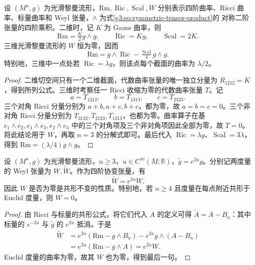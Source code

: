 \begin{proposition}\label{g3:prop:low-dimensional-curvature}
	设 \((M^n,g)\) 为光滑黎曼流形，\(\mathrm{Rm},\operatorname{Ric},\operatorname{Scal},W\) 分别表示四阶曲率、Ricci 曲率、标量曲率和 Weyl 张量，\(\wedge\) 为式\eqref{g3:eq:symmetric-tensor-product}的 对称二阶张量的四阶乘积。二维时，记 \(K\) 为 Gauss 曲率，则
	\[
		\mathrm{Rm}=\tfrac K2g\wedge g,\qquad
		\operatorname{Ric}=Kg,\qquad \operatorname{Scal}=2K.
	\]
	三维光滑黎曼流形的 \(W\) 恒为零，因而
	\[
		\mathrm{Rm}=g\wedge\operatorname{Ric}
		-\tfrac{\operatorname{Scal}}4g\wedge g.
	\]
	特别地，三维中一点处若 \(\operatorname{Ric}=\lambda g\)，则该点每个截面的曲率为 \(\lambda/2\)。
\end{proposition}
\begin{proof}
	二维切空间只有一个二维截面，代数曲率张量的唯一独立分量为 \(R_{1212}=K\)，得到所列公式。三维时考察任一 Ricci 收缩为零的代数曲率张量 \(T\)。记
	\[
		a=T_{1212},\qquad b=T_{1313},\qquad c=T_{2323}.
	\]
	三个对角 Ricci 分量分别为 \(a+b,a+c,b+c\)，都为零，故 \(a=b=c=0\)。三个非对角 Ricci 分量分别为 \(T_{3132},T_{2123},T_{1213}\)，也都为零。曲率算子在基 \(e_1\wedge e_2,e_1\wedge e_3,e_2\wedge e_3\) 中的三个对角项及三个非对角项因此全部为零，故 \(T=0\)。将此结论用于 \(W\)，再取 \(n=3\) 的分解式即可。最后代入 \(\operatorname{Ric}=\lambda g\)、\(\operatorname{Scal}=3\lambda\)，得到 \(\mathrm{Rm}=(\lambda/4)g\wedge g\)。
\end{proof}

\begin{proposition}\label{g3:prop:conformal-weyl}
	设 \((M^n,g)\) 为光滑黎曼流形，\(n\ge3\)，\(u\in C^\infty(M;\mathbb R)\)，\(\widetilde g=e^{2u}g\)。分别记两度量的 Weyl 张量为 \(W,\widetilde W\)。作为四阶协变张量，有
	\[
		\widetilde W=e^{2u}W.
	\]
	因此 \(W\) 是否为零是共形不变的性质。特别地，若 \(n\ge4\) 且度量在每点附近共形于 Euclid 度量，则 \(W=0\)。
\end{proposition}
\begin{proof}
	由 Ricci 与标量的共形公式，将它们代入 \(A\) 的定义可得 \(\widetilde A=A-B_u\)：其中标量的 \(e^{-2u}\) 与 \(\widetilde g\) 的 \(e^{2u}\) 抵消。于是
	\[
		\begin{aligned}
		\widetilde W
		&=e^{2u}(\mathrm{Rm}-g\wedge B_u)
		-e^{2u}g\wedge(A-B_u)\\
		&=e^{2u}(\mathrm{Rm}-g\wedge A)=e^{2u}W.
		\end{aligned}
	\]
	Euclid 度量的曲率为零，故其 \(W\) 也为零，得到最后一句。
\end{proof}

